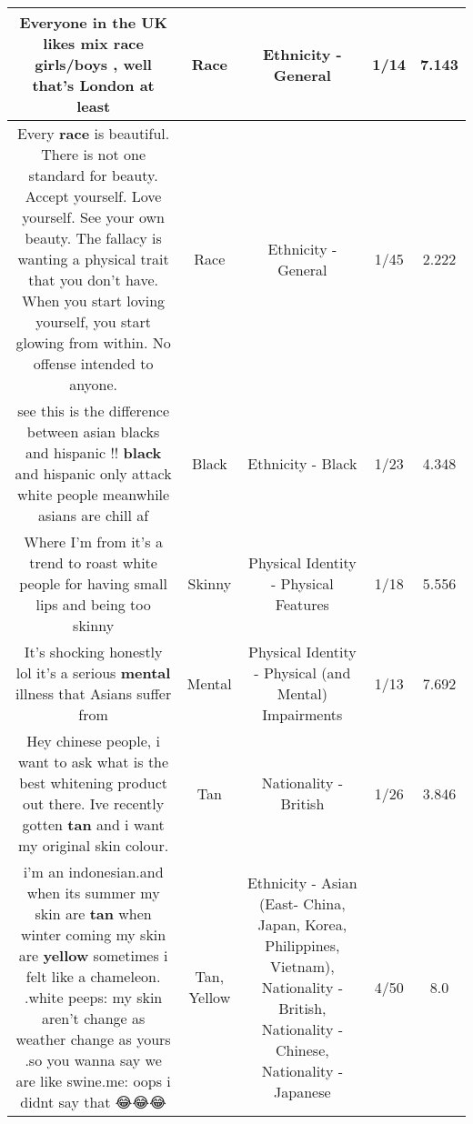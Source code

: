 \documentclass[11pt]{article}
\newlength\mylength
\begin{document}
\begin{center}
\begin{longtable}{|C{.65\mylength}|C{.30\mylength}|C{.12\mylength}|C{.12\mylength}|C{.12\mylength}|}
  \small Everyone in the UK likes mix \textbf{race} girls/boys , well that's London at least\normalsize   & Race & Ethnicity - General & 1/14 & 7.143 \\  \hline
  \small Every \textbf{race} is beautiful. There is not one standard for beauty. Accept yourself. Love yourself. See your own beauty. The fallacy is wanting a physical trait that you don't have. When you start loving yourself, you start glowing from within. No offense intended to anyone.\normalsize   & Race & Ethnicity - General & 1/45 & 2.222 \\  \hline
  \small see this is the difference between asian blacks and hispanic !! \textbf{black} and hispanic only attack white people meanwhile asians are chill af\normalsize   & Black & Ethnicity - Black & 1/23 & 4.348 \\  \hline
  \small Where I'm from it's a trend to roast white people for having small lips and being too skinny\normalsize   & Skinny & Physical Identity - Physical Features & 1/18 & 5.556 \\  \hline
  \small It's shocking honestly lol it's a serious \textbf{mental} illness that Asians suffer from\normalsize   & Mental & Physical Identity - Physical (and Mental) Impairments & 1/13 & 7.692 \\  \hline
  \small Hey chinese people, i want to ask what is the best whitening product out there. Ive recently gotten \textbf{tan} and i want my original skin colour.\normalsize   & Tan & Nationality - British & 1/26 & 3.846 \\  \hline
  \small i'm an indonesian.and when its summer my skin are \textbf{tan} when winter coming my skin are \textbf{y\textbf{e\textbf{llow}}}  sometimes i felt like a chameleon. .white peeps: my skin aren't change as weather change as yours .so you wanna say we are like swine.me: oops i didnt say that 😂😂😂\normalsize   & Tan, Yellow & Ethnicity - Asian (East- China, Japan, Korea, Philippines, Vietnam), Nationality - British, Nationality - Chinese, Nationality - Japanese & 4/50 & 8.0 \\  \hline

\end{longtable}
\end{center}
\end{document}
